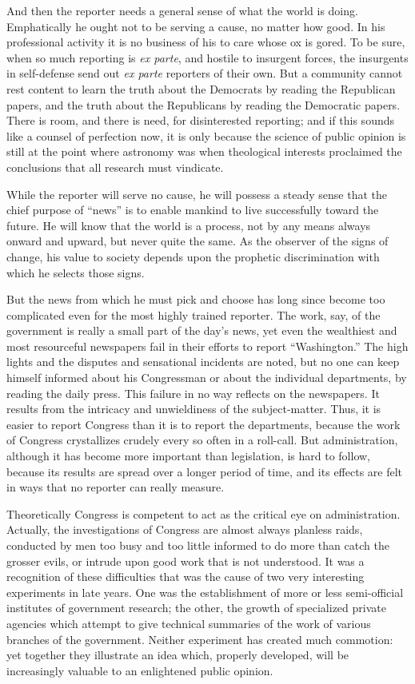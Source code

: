 \documentclass[openany,nobib,nohyper]{tufte-book}
\begin{document}
And then the reporter needs a general sense of what the world is doing.
Emphatically he ought not to be serving a cause, no matter how good. In
his professional activity it is no business of his to care whose ox is
gored. To be sure, when so much reporting is \emph{ex parte}, and
hostile to insurgent forces, the insurgents in self-defense send out
\emph{ex parte} reporters of their own. But a community cannot rest
content to learn the truth about the Democrats by reading the Republican
papers, and the truth about the Republicans by reading the Democratic
papers. There is room, and there is need, for disinterested reporting;
and if this sounds like a counsel of perfection now, it is only because
the science of public opinion is still at the point where astronomy was
when theological interests proclaimed the conclusions that all research
must vindicate.

While the reporter will serve no cause, he will possess a steady sense
that the chief purpose of ``news'' is to enable mankind to live
successfully toward the future. He will know that the world is a
process, not by any means always onward and upward, but never quite the
same. As the observer of the signs of change, his value to society
depends upon the prophetic discrimination with which he selects those
signs.

But the news from which he must pick and choose has long since become
too complicated even for the most highly trained reporter. The work,
say, of the government is really a small part of the day's news, yet
even the wealthiest and most resourceful newspapers fail in their
efforts to report ``Washington.'' The high lights and the disputes and
sensational incidents are noted, but no one can keep himself informed
about his Congressman or about the individual departments, by reading
the daily press. This failure in no way reflects on the newspapers. It
results from the intricacy and unwieldiness of the subject-matter. Thus,
it is easier to report Congress than it is to report the departments,
because the work of Congress crystallizes crudely every so often in a
roll-call. But administration, although it has become more important
than legislation, is hard to follow, because its results are spread over
a longer period of time, and its effects are felt in ways that no
reporter can really measure.

Theoretically Congress is competent to act as the critical eye on
administration. Actually, the investigations of Congress are almost
always planless raids, conducted by men too busy and too little informed
to do more than catch the grosser evils, or intrude upon good work that
is not understood. It was a recognition of these difficulties that was
the cause of two very interesting experiments in late years. One was the
establishment of more or less semi-official institutes of government
research; the other, the growth of specialized private agencies which
attempt to give technical summaries of the work of various branches of
the government. Neither experiment has created much commotion: yet
together they illustrate an idea which, properly developed, will be
increasingly valuable to an enlightened public opinion.
\end{document}
